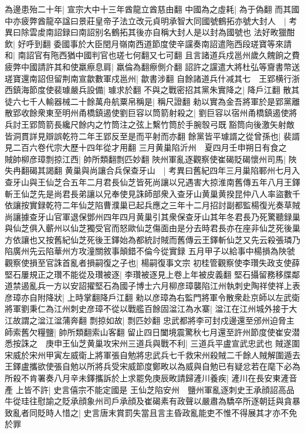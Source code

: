為邊患殆二十年|{
	宣宗大中十三年酋龍立酋慈由翻}
中國為之虛耗|{
	為于偽翻}
而其國中亦疲弊酋龍卒諡曰景莊皇帝子法立改元貞明承智大同國號鶴拓亦號大封人　|{
	考異曰除雲䖍南詔録曰南詔别名鶴拓其後亦自稱大封人是以封為國號也}
法好畋獵酣飲|{
	好呼到翻}
委國事於大臣閏月嶺南西道節度使辛讜奏南詔遣陁西段瑳寶等來請和|{
	南詔官有陁西猶中國判官也瑳七何翻又七可翻}
且言諸道兵戍邕州歲久餽餉之費疲弊中國請許其和使羸瘵息肩|{
	羸倫為翻瘵側介翻}
詔許之讜遣大將杜弘等齎書幣送瑳寶還南詔但留荆南宣歙數軍戍邕州|{
	歙書涉翻}
自餘諸道兵什减其七　王郢横行浙西鎮海節度使裴璩嚴兵設備|{
	璩求於翻}
不與之戰密招其黨朱實降之|{
	降戶江翻}
散其徒六七千人輸器械二十餘萬舟航粟帛稱是|{
	稱尺證翻}
勑以實為金吾將軍於是郢黨離散郢收餘衆東至明州甬橋鎮遏使劉巨容以筒箭射殺之|{
	劉巨容以宿州甬橋鎮遏使將兵討王郢筒箭長纔尺餘内之竹筒注之弦上繫竹筒於手腕彀弓既豁筒向後激矢射敵皆洞貫詳見辯誤乾符二年王郢反至是而平射而亦翻}
餘黨皆平璩諝之從曾孫也|{
	裴諝見二百六卷代宗大歷十四年從才用翻}
三月黄巢陷沂州　夏四月壬申朔日有食之　賊帥柳彦璋剽掠江西|{
	帥所類翻剽匹妙翻}
陜州軍亂逐觀察使崔碣貶碣懷州司馬|{
	陜失冉翻碣其謁翻}
黄巢與尚讓合兵保查牙山　|{
	考異曰舊紀四年三月巢陷鄆州七月入查牙山與王仙芝合五年二月君長仙芝皆死尚讓以兄遇害大掠淮南舊傳五年八月王鐸斬王仙芝先是尚君長弟讓以兄奉使見誅師部衆入查牙山黄巢黄揆昆仲八人率盜數千依讓按實録乾符二年仙芝陷曹濮巢已起兵應之三年十二月招討副都監楊復光奏草賊尚讓據查牙山官軍退保鄧州四年四月黄巢引其衆保查牙山其年冬君長乃死驚聽録巢與仙芝俱入蘄州以仙芝獨受官而怒歐仙芝傷面由是分去時君長亦在座非仙芝死後巢方依讓也又按舊紀仙芝死後王鐸始為都統討賊而舊傳云王鐸斬仙芝又先云殺張璘乃陷廣州先云陷華州方攻潼關敘事顛錯不倫今從實録}
五月甲子以給事中楊損為陜虢觀察使損至官誅首亂者損嗣復之子也|{
	楊嗣復事文宗}
初桂管觀察使李瓚失政支使薛堅石屢規正之瓚不能從及瓚被逐|{
	李瓚被逐見上卷上年被皮義翻}
堅石攝留務移牒鄰道禁遏亂兵一方以安詔擢堅石為國子博士六月柳彦璋襲陷江州執刺史陶祥使祥上表彦璋亦自附降狀|{
	上時掌翻降戶江翻}
勑以彦璋為右監門將軍令散衆赴京師以左武衛將軍劉秉仁為江州刺史彦璋不從以戰艦百餘固湓江為水寨|{
	湓江在江州城外接于大江故謂之湓江湓蒲奔翻}
剽掠如故|{
	剽匹妙翻}
忠武都將李可封戍邊還至邠州迫脅主師索舊欠糧鹽|{
	帥所類翻索山客翻}
留止四日闔境震驚秋七月還至許州節度使崔安潜悉按誅之　庚申王仙芝黄巢攻宋州三道兵與戰不利|{
	三道兵平盧宣武忠武也}
賊遂圍宋威於宋州甲寅左威衛上將軍張自勉將忠武兵七千救宋州殺賊二千餘人賊解圍遁去王鐸盧攜欲使張自勉以所將兵受宋威節度鄭畋以為威與自勉已有疑忿若在麾下必為所殺不肯署奏八月辛未鐸攜訴於上求罷免庚辰畋請歸滻川養疾|{
	滻川在長安東滻音產}
上皆不許|{
	史言僖宗不能定國是}
王仙芝陷安州　鹽州軍亂逐刺史王承顔詔高品牛從珪往慰諭之貶承顔象州司戶承顔及崔碣素有政聲以嚴肅為驕卒所逐朝廷與貪暴致亂者同貶時人惜之|{
	史言唐末賞罰失當且言主昏政亂能吏不惟不得展其才亦不免於罪}
